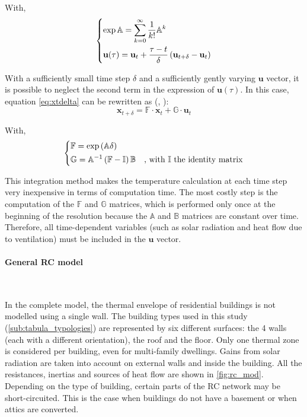 \documentclass[11pt]{article}
\begin{document}
        \noindent
        With,
        $$
        \begin{dcases}
          \exp \mathbb{A}= \sum_{k=0}^\infty \frac{1}{k!}\mathbb{A}^k\\
          \mathbf{u}(\tau)= \mathbf{u}_t + \frac{\tau-t}{\delta}\left(\mathbf{u}_{t+\delta}-\mathbf{u}_t\right)\\
        \end{dcases}
        $$

        With a sufficiently small time step $\delta$ and a sufficiently gently varying $\mathbf{u}$ vector, it is possible to neglect the second term in the expression of $\mathbf{u}(\tau)$. In this case, equation \eqref{eq:xtdelta} can be rewritten as (\cite{seem_transfer_1989}, \cite{madsen_estimation_1995}): 
        \begin{equation}\label{eq:xtfg}
            \mathbf{x}_{t+\delta} = \mathbb{F}\cdot\mathbf{x}_{t} + \mathbb{G}\cdot\mathbf{u}_{t}
        \end{equation}
        
        \noindent
        With,
        $$
        \begin{dcases}
          \mathbb{F} = \exp\left(\mathbb{A}\delta\right)\\
          \mathbb{G}= \mathbb{A}^{-1}\left(\mathbb{F}-\mathbb{I}\right)\mathbb{B}&\text{, with $\mathbb{I}$ the identity matrix}\\
        \end{dcases}
        $$

        This integration method makes the temperature calculation at each time step very inexpensive in terms of computation time. The most costly step is the computation of the $\mathbb{F}$ and $\mathbb{G}$ matrices, which is performed only once at the beginning of the resolution because the $\mathbb{A}$ and $\mathbb{B}$ matrices are constant over time. Therefore, all time-dependent variables (such as solar radiation and heat flow due to ventilation) must be included in the $\mathbf{u}$ vector. 
        
        

        \paragraph{General RC model}\mbox{}\\ %
        \label{par:general_rc_model}
        
        In the complete model, the thermal envelope of residential buildings is not modelled using a single wall. The building types used in this study (\ref{sub:tabula_typologies}) are represented by six different surfaces: the 4 walls (each with a different orientation), the roof and the floor. Only one thermal zone is considered per building, even for multi-family dwellings. Gains from solar radiation are taken into account on external walls and inside the building. All the resistances, inertias and sources of heat flow are shown in \ref{fig:rc_mod}. Depending on the type of building, certain parts of the RC network may be short-circuited. This is the case when buildings do not have a basement or when attics are converted. \\
\end{document}
